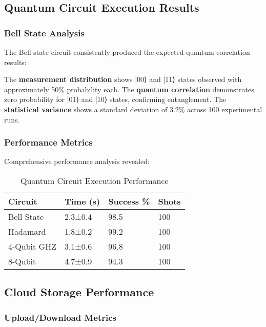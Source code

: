 \documentclass[onecolumn]{IEEEtran}
\begin{document}
\subsection{Quantum Circuit Execution Results}

\subsubsection{Bell State Analysis}

The Bell state circuit consistently produced the expected quantum correlation results:

The \textbf{measurement distribution} shows |00⟩ and |11⟩ states observed with approximately 50\% probability each. The \textbf{quantum correlation} demonstrates zero probability for |01⟩ and |10⟩ states, confirming entanglement. The \textbf{statistical variance} shows a standard deviation of 3.2\% across 100 experimental runs.

\subsubsection{Performance Metrics}

Comprehensive performance analysis revealed:

\begin{table}[h]
\centering
\caption{Quantum Circuit Execution Performance}
\footnotesize
\begin{tabular}{|p{1.8cm}|p{1.5cm}|p{1.5cm}|p{1cm}|}
\hline
\textbf{Circuit} & \textbf{Time (s)} & \textbf{Success \%} & \textbf{Shots} \\
\hline
Bell State & 2.3±0.4 & 98.5 & 100 \\
Hadamard & 1.8±0.2 & 99.2 & 100 \\
4-Qubit GHZ & 3.1±0.6 & 96.8 & 100 \\
8-Qubit & 4.7±0.9 & 94.3 & 100 \\
\hline
\end{tabular}
\end{table}

\subsection{Cloud Storage Performance}

\subsubsection{Upload/Download Metrics}
\end{document}
